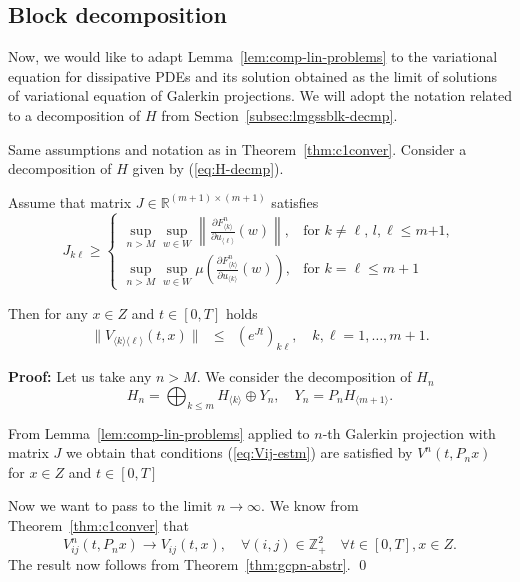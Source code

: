\subsection{Block decomposition}
\label{subsec:blockdecmp}
Now, we would like to adapt Lemma~\ref{lem:comp-lin-problems} to the variational equation for dissipative PDEs and its solution obtained as the limit of solutions of variational equation of Galerkin projections. We will adopt the notation related to a decomposition of $H$ from Section~\ref{subsec:lmgssblk-decmp}.

\begin{theorem}
\label{thm:lineqestm-inf}
 Same assumptions and notation as in Theorem~\ref{thm:c1conver}.  Consider a decomposition of $H$ given by (\ref{eq:H-decmp}).


 Assume that matrix $J \in \mathbb{R}^{(m+1) \times (m+1)}$ satisfies
\begin{equation*}%
 J_{k\ell} \geq
  \begin{cases}
     \sup_{n>M} \sup_{w \in W} \left\|\frac{\partial F^n_{\langle k \rangle}}{\partial u_{\langle \ell \rangle}}(w) \right\|,  & \text{for $k \neq \ell$, $l,\ell \leq m$+1}, \\
     \sup_{n>M} \sup_{w \in W}  \mu\left(\frac{ \partial F^n_{\langle k \rangle} }{\partial u_{\langle k \rangle}}(w) \right),     & \text{for $k=\ell\leq m+1$}
  \end{cases}
\end{equation*}


Then for any  $x \in Z$ and  $t \in [0,T]$
holds
\begin{eqnarray}
  \|V_{\langle k \rangle \langle \ell \rangle}(t,x)\| &\leq&  \left(e^{Jt}\right)_{k\ell},  \quad k,\ell=1,\dots,m+1.   \label{eq:Vij-estm}
\end{eqnarray}
\end{theorem}
\textbf{Proof:}
Let us take any $n > M$. We consider the decomposition of $H_n$
\begin{equation*}
H_n=\bigoplus_{k \leq m} H_{\langle k \rangle}   \oplus Y_n, \quad Y_n=P_n  H_{\langle m+1 \rangle}.
\end{equation*}

From Lemma~\ref{lem:comp-lin-problems} applied to $n$-th Galerkin projection with matrix $J$ we obtain that conditions (\ref{eq:Vij-estm}) are satisfied by  $V^n(t,P_n x)$ for $x \in Z$ and $t \in [0,T]$


Now we want to pass to the limit  $n \to \infty$.   We know from Theorem~\ref{thm:c1conver} that
\begin{equation*}
V^n_{ij}(t,P_nx) \to V_{ij}(t,x), \quad \forall (i,j)\in \mathbb{Z}_+^2  \quad \forall t \in [0,T], x\in Z. %
\end{equation*}
The result now follows from Theorem~\ref{thm:gcpn-abstr}.
\qed





